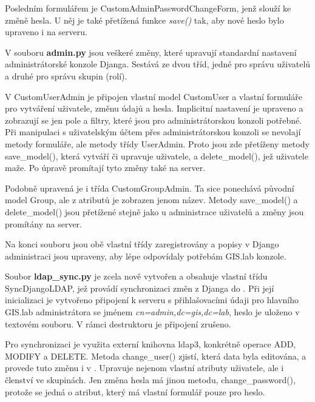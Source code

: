 Posledním formulářem je \textsf{CustomAdminPasswordChangeForm}, jenž
slouží ke změně hesla. U něj je také přetížená funkce \textit{save()}
tak, aby nové heslo bylo upraveno i na serveru.

V souboru \textbf{admin.py} jsou veškeré změny, které upravují
standardní nastavení administrátorské konzole Djanga. Sestává ze dvou
tříd, jedné pro správu uživatelů a druhé pro správu skupin (rolí).

V \textsf{CustomUserAdmin} je připojen vlastní model
\textsf{CustomUser} a vlastní formuláře pro vytváření uživatele, změnu
údajů a hesla. Implicitní nastavení je upraveno a zobrazují se jen
pole a filtry, které jsou pro administrátorskou konzoli potřebné. Při
manipulaci s uživatelským účtem přes administrátorskou konzoli se
nevolají metody formuláře, ale metody třídy \textsf{UserAdmin}. Proto
jsou zde přetíženy metody \textsf{save\_model()}, která vytváří či
upravuje uživatele, a \textsf{delete\_model()}, jež uživatele maže. Po
úpravě promítají tyto změny také na  server.

Podobně upravená je i třída \textsf{CustomGroupAdmin}. Ta sice
ponechává původní model \textsf{Group}, ale z atributů je zobrazen
jenom název. Metody \textsf{save\_model()} a \textsf{delete\_model()}
jsou přetížené stejně jako u administrace uživatelů a změny jsou
promítány na  server.

Na konci souboru jsou obě vlastní třídy zaregistrovány a popisy v
Django administraci jsou upraveny, aby lépe odpovídaly potřebám
GIS.lab konzole.

Soubor \textbf{ldap\_sync.py} je zcela nově vytvořen a obsahuje
vlastní třídu \textsf{SyncDjangoLDAP}, jež provádí synchronizaci změn
z Djanga do . Při její inicializaci je vytvořeno připojení k
 serveru s přihlašovacími údaji pro hlavního GIS.lab
administrátora se jménem \textit{cn=admin,dc=gis,dc=lab}, heslo je
uloženo v textovém souboru. V rámci destruktoru je připojení zrušeno.

Pro synchronizaci je využita externí knihovna ldap3, konkrétně operace
\textsf{ADD}, \textsf{MODIFY} a \textsf{DELETE}. Metoda
\textsf{change\_user()} zjistí, která data byla editována, a provede
tuto změnu i v . Upravuje nejenom vlastní atributy uživatele,
ale i členství ve skupinách. Jen změna hesla má jinou metodu,
\textsf{change\_password()}, protože se jedná o atribut, který má
vlastní formulář pouze pro heslo.

